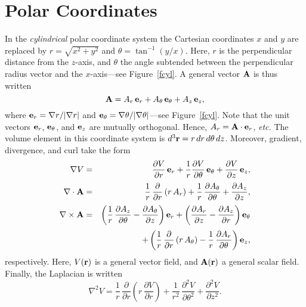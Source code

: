 \section{Polar Coordinates}\label{spolar}
In the {\em cylindrical}\/ polar coordinate system the Cartesian coordinates $x$ and
$y$ are replaced by $r=\sqrt{x^2+y^2}$ and $\theta=\tan^{-1}(y/x)$.
Here, $r$ is the perpendicular distance from the $z$-axis, and $\theta$
the angle subtended between the perpendicular radius vector and the $x$-axis---see
Figure~\ref{fcyl}. A general  vector ${\bf A}$ is thus written
\begin{equation}
{\bf A} = A_r\,{\bf e}_r+ A_\theta\,{\bf e}_\theta + A_z\,{\bf e}_z,
\end{equation}
where ${\bf e}_r=\nabla r/|\nabla r|$ and ${\bf e}_\theta = \nabla\theta/|\nabla\theta|$---see Figure~\ref{fcyl}. Note that the unit vectors
${\bf e}_r$, ${\bf e}_\theta$, and ${\bf e}_z$ are mutually orthogonal.
Hence, $A_r = {\bf A}\cdot {\bf e}_r$, {\em etc.} The
volume element in this coordinate system is $d^3{\bf r} = r\,dr\,d\theta\,dz$. 
Moreover, gradient, divergence, and curl take the form
\begin{eqnarray}
\nabla V &=& \frac{\partial V}{\partial r}\,{\bf e}_r
+ \frac{1}{r}\frac{\partial V}{\partial\theta}\,{\bf e}_\theta
+ \frac{\partial V}{\partial z}\,{\bf e}_z,\\[0.5ex]
\nabla\cdot {\bf A} &=&\frac{1}{r}\,\frac{\partial}{\partial r}\,(r\,A_r) + \frac{1}{r}\,\frac{\partial A_\theta}{\partial\theta} + \frac{\partial A_z}{\partial z},\\[0.5ex]
\nabla\times{\bf A} &=& \left(\frac{1}{r}\,\frac{\partial A_z}{\partial \theta}-\frac{\partial A_\theta}{\partial z}\right){\bf e}_r
+\left(\frac{\partial A_r}{\partial z}-\frac{\partial A_z}{\partial r}\right){\bf e}_\theta\nonumber\\[0.5ex]
&&+ \left(\frac{1}{r}\,\frac{\partial}{\partial r}\,(r\,A_\theta) - \frac{1}{r}\,\frac{\partial A_r}{\partial\theta}\right){\bf e}_z,\label{spcurl}
\end{eqnarray}
respectively. Here, $V({\bf r})$ is a general vector field, and ${\bf A}({\bf r})$ a general scalar field. Finally, the Laplacian is written
\begin{equation}
\nabla^2 V = \frac{1}{r}\,\frac{\partial}{\partial r}\left(r\,\frac{\partial V}{\partial r}\right) + \frac{1}{r^2}\,\frac{\partial^2 V}{\partial\theta^2} + \frac{\partial^2 V}{\partial z^2}.
\end{equation} 


